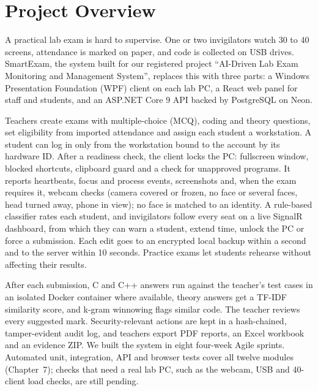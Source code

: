 \newpage
\thispagestyle{empty}
\chapter*{\centering Project Overview}

A practical lab exam is hard to supervise. One or two invigilators watch 30 to 40 screens, attendance is marked on paper, and code is collected on USB drives. SmartExam, the system built for our registered project ``AI-Driven Lab Exam Monitoring and Management System'', replaces this with three parts: a Windows Presentation Foundation (WPF) client on each lab PC, a React web panel for staff and students, and an ASP.NET Core 9 API backed by PostgreSQL on Neon.

Teachers create exams with multiple-choice (MCQ), coding and theory questions, set eligibility from imported attendance and assign each student a workstation. A student can log in only from the workstation bound to the account by its hardware ID. After a readiness check, the client locks the PC: fullscreen window, blocked shortcuts, clipboard guard and a check for unapproved programs. It reports heartbeats, focus and process events, screenshots and, when the exam requires it, webcam checks (camera covered or frozen, no face or several faces, head turned away, phone in view); no face is matched to an identity. A rule-based classifier rates each student, and invigilators follow every seat on a live SignalR dashboard, from which they can warn a student, extend time, unlock the PC or force a submission. Each edit goes to an encrypted local backup within a second and to the server within 10 seconds. Practice exams let students rehearse without affecting their results.

After each submission, C and C++ answers run against the teacher's test cases in an isolated Docker container where available, theory answers get a TF-IDF similarity score, and k-gram winnowing flags similar code. The teacher reviews every suggested mark. Security-relevant actions are kept in a hash-chained, tamper-evident audit log, and teachers export PDF reports, an Excel workbook and an evidence ZIP. We built the system in eight four-week Agile sprints. Automated unit, integration, API and browser tests cover all twelve modules (Chapter~7); checks that need a real lab PC, such as the webcam, USB and 40-client load checks, are still pending.
